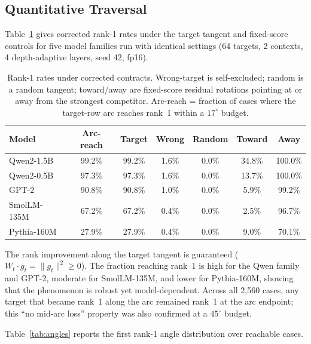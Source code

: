 \documentclass{article}
\begin{document}
\subsection{Quantitative Traversal}

Table~\ref{tab:cross-family} gives corrected rank-1 rates under the target
tangent and fixed-score controls for five model families run with identical
settings (64 targets, 2 contexts, 4 depth-adaptive layers, seed 42, fp16).

\begin{table}[h]
\centering
\begin{tabular}{lcccccc}
\toprule
Model & Arc-reach & Target & Wrong & Random & Toward & Away \\
\midrule
Qwen2-1.5B & 99.2\% & 99.2\% & 1.6\% & 0.0\% & 34.8\% & 100.0\% \\
Qwen2-0.5B & 97.3\% & 97.3\% & 1.6\% & 0.0\% & 13.7\% & 100.0\% \\
GPT-2 & 90.8\% & 90.8\% & 1.0\% & 0.0\% & 5.9\% & 99.2\% \\
SmolLM-135M & 67.2\% & 67.2\% & 0.4\% & 0.0\% & 2.5\% & 96.7\% \\
Pythia-160M & 27.9\% & 27.9\% & 0.4\% & 0.0\% & 9.0\% & 70.1\% \\
\bottomrule
\end{tabular}
\caption{Rank-1 rates under corrected contracts. Wrong-target is self-excluded;
random is a random tangent; toward/away are fixed-score residual rotations
pointing at or away from the strongest competitor. Arc-reach = fraction of
cases where the target-row arc reaches rank~1 within a $17^\circ$ budget.}
\label{tab:cross-family}
\end{table}

The rank improvement along the target tangent is guaranteed ($W_t \cdot g_t =
\|g_t\|^2 \geq 0$). The fraction reaching rank~1 is high for the Qwen family
and GPT-2, moderate for SmolLM-135M, and lower for Pythia-160M, showing that the
phenomenon is robust yet model-dependent. Across all 2,560 cases, any target
that became rank~1 along the arc remained rank~1 at the arc endpoint; this ``no
mid-arc loss'' property was also confirmed at a $45^\circ$ budget.

Table~\ref{tab:angles} reports the first rank-1 angle distribution over
reachable cases.
\end{document}
